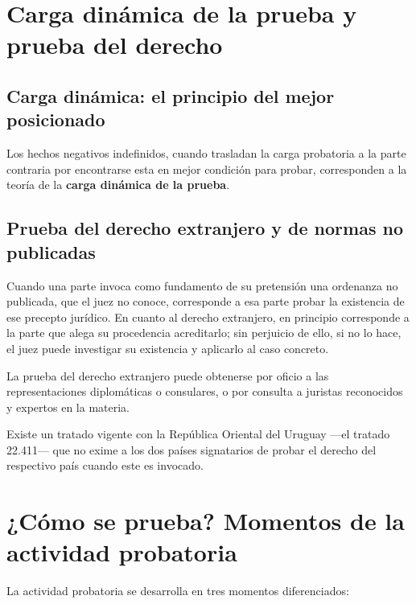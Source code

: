 \documentclass[12pt,oneside]{book}
\begin{document}
\section{Carga dinámica de la prueba y prueba del derecho}

\subsection{Carga dinámica: el principio del mejor posicionado}

Los hechos negativos indefinidos, cuando trasladan la carga probatoria a la parte contraria por encontrarse esta en mejor condición para probar, corresponden a la teoría de la \textbf{carga dinámica de la prueba}.

\subsection{Prueba del derecho extranjero y de normas no publicadas}

Cuando una parte invoca como fundamento de su pretensión una ordenanza no publicada, que el juez no conoce, corresponde a esa parte probar la existencia de ese precepto jurídico. En cuanto al derecho extranjero, en principio corresponde a la parte que alega su procedencia acreditarlo; sin perjuicio de ello, si no lo hace, el juez puede investigar su existencia y aplicarlo al caso concreto.

La prueba del derecho extranjero puede obtenerse por oficio a las representaciones diplomáticas o consulares, o por consulta a juristas reconocidos y expertos en la materia.

\begin{note}
Existe un tratado vigente con la República Oriental del Uruguay —el tratado 22.411— que no exime a los dos países signatarios de probar el derecho del respectivo país cuando este es invocado.
\end{note}

\section{¿Cómo se prueba? Momentos de la actividad probatoria}

La actividad probatoria se desarrolla en tres momentos diferenciados:
\end{document}
